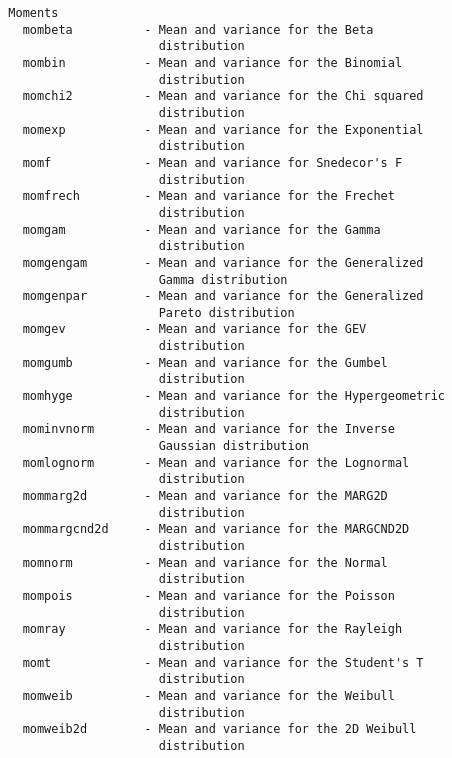{\begin{verbatim}
  Moments
    mombeta          - Mean and variance for the Beta
                       distribution
    mombin           - Mean and variance for the Binomial
                       distribution
    momchi2          - Mean and variance for the Chi squared
                       distribution
    momexp           - Mean and variance for the Exponential
                       distribution
    momf             - Mean and variance for Snedecor's F
                       distribution
    momfrech         - Mean and variance for the Frechet
                       distribution
    momgam           - Mean and variance for the Gamma
                       distribution
    momgengam        - Mean and variance for the Generalized
                       Gamma distribution
    momgenpar        - Mean and variance for the Generalized
                       Pareto distribution
    momgev           - Mean and variance for the GEV
                       distribution
    momgumb          - Mean and variance for the Gumbel
                       distribution
    momhyge          - Mean and variance for the Hypergeometric
                       distribution
    mominvnorm       - Mean and variance for the Inverse
                       Gaussian distribution
    momlognorm       - Mean and variance for the Lognormal
                       distribution
    mommarg2d        - Mean and variance for the MARG2D
                       distribution
    mommargcnd2d     - Mean and variance for the MARGCND2D
                       distribution
    momnorm          - Mean and variance for the Normal
                       distribution
    mompois          - Mean and variance for the Poisson
                       distribution
    momray           - Mean and variance for the Rayleigh
                       distribution
    momt             - Mean and variance for the Student's T
                       distribution
    momweib          - Mean and variance for the Weibull
                       distribution
    momweib2d        - Mean and variance for the 2D Weibull
                       distribution


\end{verbatim}}
